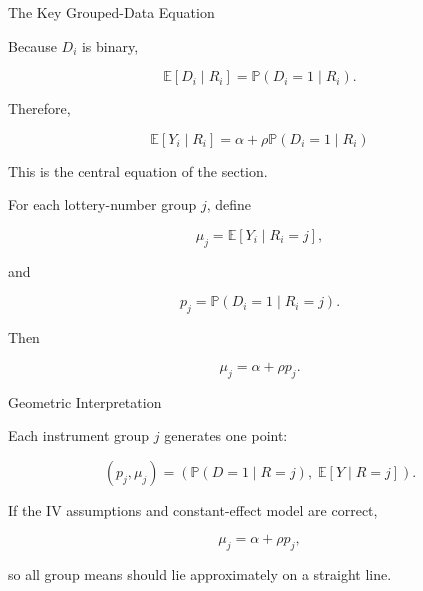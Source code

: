 \documentclass[aspectratio=169]{beamer}
\newcommand{\E}{\mathbb{E}}
\newcommand{\Prob}{\mathbb{P}}
\begin{document}
\begin{frame}{The Key Grouped-Data Equation}

Because \(D_i\) is binary,

\[
\E[D_i\mid R_i]
=
\Prob(D_i=1\mid R_i).
\]

Therefore,

\[
\boxed{
\E[Y_i\mid R_i]
=
\alpha
+
\rho
\Prob(D_i=1\mid R_i)
}
\]

This is the central equation of the section.

\vspace{0.4cm}

For each lottery-number group \(j\), define

\[
\mu_j = \E[Y_i\mid R_i=j],
\]

and

\[
p_j = \Prob(D_i=1\mid R_i=j).
\]

Then

\[
\boxed{
\mu_j=\alpha+\rho p_j.
}
\]

\end{frame}

\begin{frame}{Geometric Interpretation}

Each instrument group \(j\) generates one point:

\[
\boxed{
(p_j,\mu_j)
=
\left(
\Prob(D=1\mid R=j),
\;
\E[Y\mid R=j]
\right).
}
\]

If the IV assumptions and constant-effect model are correct,

\[
\mu_j=\alpha+\rho p_j,
\]

so all group means should lie approximately on a straight line.

\vspace{0.3cm}

\begin{center}
\end{center}

\end{frame}
\end{document}
